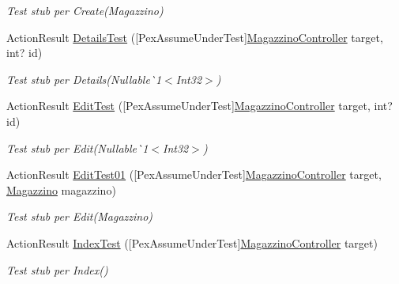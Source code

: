 \begin{DoxyCompactItemize}
\begin{DoxyCompactList}\small\item\em Test stub per Create(\+Magazzino)\end{DoxyCompactList}\item 
Action\+Result \mbox{\hyperlink{class_brew_day2_1_1_controllers_1_1_tests_1_1_magazzino_controller_test_a0017684d3cc954acefdcb94b73639d80}{Details\+Test}} (\mbox{[}Pex\+Assume\+Under\+Test\mbox{]}\mbox{\hyperlink{class_brew_day2_1_1_controllers_1_1_magazzino_controller}{Magazzino\+Controller}} target, int? id)
\begin{DoxyCompactList}\small\item\em Test stub per Details(Nullable\`{}1$<$Int32$>$)\end{DoxyCompactList}\item 
Action\+Result \mbox{\hyperlink{class_brew_day2_1_1_controllers_1_1_tests_1_1_magazzino_controller_test_a33997af15e63b82b60dac06b390fed65}{Edit\+Test}} (\mbox{[}Pex\+Assume\+Under\+Test\mbox{]}\mbox{\hyperlink{class_brew_day2_1_1_controllers_1_1_magazzino_controller}{Magazzino\+Controller}} target, int? id)
\begin{DoxyCompactList}\small\item\em Test stub per Edit(Nullable\`{}1$<$Int32$>$)\end{DoxyCompactList}\item 
Action\+Result \mbox{\hyperlink{class_brew_day2_1_1_controllers_1_1_tests_1_1_magazzino_controller_test_a6592cd6f5e4c66e566c8af09b57749e1}{Edit\+Test01}} (\mbox{[}Pex\+Assume\+Under\+Test\mbox{]}\mbox{\hyperlink{class_brew_day2_1_1_controllers_1_1_magazzino_controller}{Magazzino\+Controller}} target, \mbox{\hyperlink{class_brew_day2_1_1_models_1_1_magazzino}{Magazzino}} magazzino)
\begin{DoxyCompactList}\small\item\em Test stub per Edit(\+Magazzino)\end{DoxyCompactList}\item 
Action\+Result \mbox{\hyperlink{class_brew_day2_1_1_controllers_1_1_tests_1_1_magazzino_controller_test_af21c41170e1ae72afc6c649e2a31dda9}{Index\+Test}} (\mbox{[}Pex\+Assume\+Under\+Test\mbox{]}\mbox{\hyperlink{class_brew_day2_1_1_controllers_1_1_magazzino_controller}{Magazzino\+Controller}} target)
\begin{DoxyCompactList}\small\item\em Test stub per Index()\end{DoxyCompactList}\end{DoxyCompactItemize}


